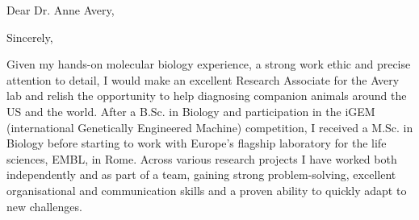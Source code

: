 \documentclass[11pt,a4paper,sans]{moderncv}
\begin{document}
\thispagestyle{titlepage}
\date{\today}
\opening{Dear Dr. Anne Avery,}
\closing{Sincerely,}
\makelettertitle
\begin{spacing}{1.1}

Given my hands-on molecular biology experience, a strong work ethic and precise attention to detail, I would make an excellent Research Associate for the Avery lab and relish the opportunity to help diagnosing companion animals around the US and the world. 
After a B.Sc. in Biology and participation in the iGEM (international Genetically Engineered Machine) competition, I received a M.Sc. in Biology before starting to work with Europe's flagship laboratory for the life sciences, EMBL, in Rome. 
Across various research projects I have worked both independently and as part of a team, gaining strong problem-solving, excellent organisational and communication skills and a proven ability to quickly adapt to new challenges.
\par%


\end{spacing}
\end{document}
